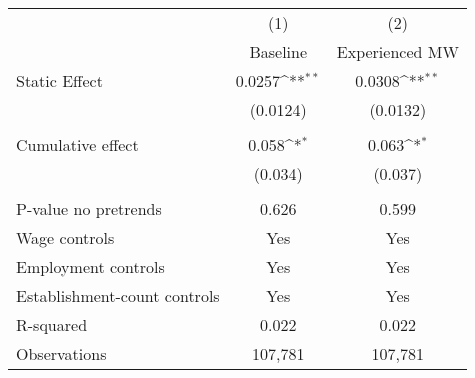 {
\def\sym#1{\ifmmode^{#1}\else\(^{#1}\)\fi}
\begin{tabular}{l*{2}{c}}
\hline\hline
          &\multicolumn{1}{c}{(1)}&\multicolumn{1}{c}{(2)}\\
          &\multicolumn{1}{c}{Baseline}&\multicolumn{1}{c}{Experienced MW}\\
\hline
Static Effect&   0.0257\sym{**} &   0.0308\sym{**} \\
          & (0.0124)         & (0.0132)         \\
\hline
\vspace{-1mm}&                  &                  \\
Cumulative effect&0.058\sym{*}         &0.063\sym{*}         \\
          &  (0.034)         &  (0.037)         \\
\hline    &                  &                  \\
P-value no pretrends&    0.626         &    0.599         \\
Wage controls&      Yes         &      Yes         \\
Employment controls&      Yes         &      Yes         \\
Establishment-count controls&      Yes         &      Yes         \\
R-squared &    0.022         &    0.022         \\
Observations&  107,781         &  107,781         \\
\hline\hline
\end{tabular}
}
